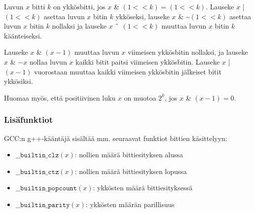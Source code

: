 Luvun $x$ bitti $k$ on ykkösbitti, jos
$x$ \& $(1 < < k) = (1 < < k)$.
Lauseke $x$ | $(1 < < k)$ asettaa luvun $x$ bitin $k$
ykköseksi, lauseke
$x$ \& \textasciitilde $(1 < < k)$
asettaa luvun $x$ bitin $k$ nollaksi ja
lauseke $x$ $\XOR$ $(1 < < k)$
muuttaa luvun $x$ bitin $k$ käänteiseksi.
% 
% 
% 

Lauseke $x$ \& $(x-1)$ muuttaa luvun $x$ viimeisen
ykkösbitin nollaksi, ja lauseke $x$ \& $-x$ nollaa
luvun $x$ kaikki bitit paitsi viimeisen ykkösbitin.
Lauseke $x$ | $(x-1)$ vuorostaan muuttaa kaikki
viimeisen ykkösbitin jälkeiset bitit ykkösiksi.

Huomaa myös, että positiivinen luku $x$ on muotoa $2^k$,
jos $x$ \& $(x-1) = 0$.
% 
% 

\subsubsection*{Lisäfunktiot}

GCC:n g++-kääntäjä sisältää mm. seuraavat funktiot
bittien käsittelyyn:

\begin{itemize}
\item
$\texttt{\_\_builtin\_clz}(x)$:
nollien määrä bittiesityksen alussa
\item
$\texttt{\_\_builtin\_ctz}(x)$:
nollien määrä bittiesityksen lopussa
\item
$\texttt{\_\_builtin\_popcount}(x)$:
ykkösten määrä bittiesityksessä
\item
$\texttt{\_\_builtin\_parity}(x)$:
ykkösten määrän parillisuus
\end{itemize}


